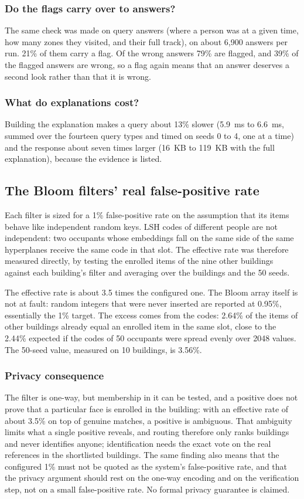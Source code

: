 \documentclass[12pt,a4paper,oneside]{report}
\begin{document}
\subsubsection{Do the flags carry over to answers?}
The same check was made on query answers (where a person was at a given time, how many zones they visited, and their full track), on about 6,900 answers per run. 21\% of them carry a flag. Of the wrong answers 79\% are flagged, and 39\% of the flagged answers are wrong, so a flag again means that an answer deserves a second look rather than that it is wrong.

\subsubsection{What do explanations cost?}
Building the explanation makes a query about 13\% slower (5.9~ms to 6.6~ms, summed over the fourteen query types and timed on seeds 0 to 4, one at a time) and the response about seven times larger (16~KB to 119~KB with the full explanation), because the evidence is listed.

\subsection{The Bloom filters' real false-positive rate}\label{sec:res-bloom}
Each filter is sized for a 1\% false-positive rate on the assumption that its items behave like independent random keys. LSH codes of different people are not independent: two occupants whose embeddings fall on the same side of the same hyperplanes receive the same code in that slot. The effective rate was therefore measured directly, by testing the enrolled items of the nine other buildings against each building's filter and averaging over the buildings and the 50 seeds.

The effective rate is about 3.5 times the configured one. The Bloom array itself is not at fault: random integers that were never inserted are reported at 0.95\%, essentially the 1\% target. The excess comes from the codes: 2.64\% of the items of other buildings already equal an enrolled item in the same slot, close to the 2.44\% expected if the codes of 50 occupants were spread evenly over 2048 values. The 50-seed value, measured on 10 buildings, is 3.56\%.

\subsubsection{Privacy consequence}
The filter is one-way, but membership in it can be tested, and a positive does not prove that a particular face is enrolled in the building: with an effective rate of about 3.5\% on top of genuine matches, a positive is ambiguous. That ambiguity limits what a single positive reveals, and routing therefore only ranks buildings and never identifies anyone; identification needs the exact vote on the real references in the shortlisted buildings. The same finding also means that the configured 1\% must not be quoted as the system's false-positive rate, and that the privacy argument should rest on the one-way encoding and on the verification step, not on a small false-positive rate. No formal privacy guarantee is claimed.
\end{document}
